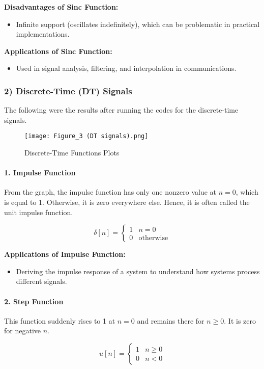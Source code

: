 \documentclass[10pt, twocolumn]{article}
\begin{document}
\textbf{Disadvantages of Sinc Function:}
\begin{itemize}
    \item Infinite support (oscillates indefinitely), which can be problematic in practical implementations.
\end{itemize}

\textbf{Applications of Sinc Function:}
\begin{itemize}
    \item Used in signal analysis, filtering, and interpolation in communications.
\end{itemize}

\subsubsection{2) Discrete-Time (DT) Signals}
The following were the results after running the codes for the discrete-time signals.
\begin{figure}[h]
    \centering
    \texttt{[image: Figure\_3 (DT signals).png]}
    \caption{Discrete-Time Functions Plots}
    \label{fig DT}
\end{figure}

\paragraph{1. Impulse Function}
From the graph, the impulse function has only one nonzero value at \(n = 0\), which is equal to 1. Otherwise, it is zero everywhere else. Hence, it is often called the unit impulse function.

\[
\delta[n] = 
\begin{cases}
1 & n = 0 \\
0 & \text{otherwise}
\end{cases}
\]

\textbf{Applications of Impulse Function:}
\begin{itemize}
    \item Deriving the impulse response of a system to understand how systems process different signals.
\end{itemize}

\paragraph{2. Step Function}
This function suddenly rises to 1 at \(n = 0\) and remains there for \(n \ge 0\). It is zero for negative \(n\).

\[
u[n] = 
\begin{cases}
1 & n \ge 0 \\
0 & n < 0
\end{cases}
\]
\end{document}

